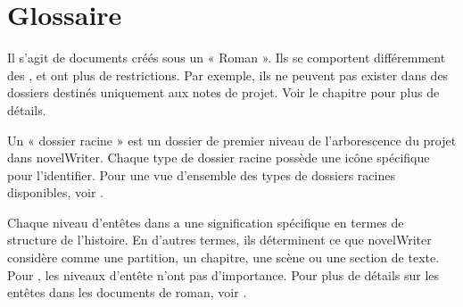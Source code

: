 \documentclass[a4paper,11pt,french]{sphinxmanual}
\begin{document}
\chapter{Glossaire}
\label{\detokenize{int_glossary:glossary}}\label{\detokenize{int_glossary:a-glossary}}\label{\detokenize{int_glossary::doc}}\begin{description}
\sphinxAtStartPar
Il s’agit de documents créés sous un {\hyperref[\detokenize{int_glossary:term-Root-Folder}]{}} « Roman ». Ils se comportent différemment des {\hyperref[\detokenize{int_glossary:term-Project-Notes}]{}}, et ont plus de restrictions. Par exemple, ils ne peuvent pas exister dans des dossiers destinés uniquement aux notes de projet. Voir le chapitre {\hyperref[\detokenize{project_structure:a-struct}]{}} pour plus de détails.

\sphinxAtStartPar
Un « dossier racine » est un dossier de premier niveau de l’arborescence du projet dans novelWriter. Chaque type de dossier racine possède une icône spécifique pour l’identifier. Pour une vue d’ensemble des types de dossiers racines disponibles, voir {\hyperref[\detokenize{project_overview:a-proj-roots}]{}}.

\sphinxAtStartPar
Chaque niveau d’en\sphinxhyphen{}têtes dans {\hyperref[\detokenize{int_glossary:term-Novel-Documents}]{}} a une signification spécifique en termes de structure de l’histoire. En d’autres termes, ils déterminent ce que novelWriter considère comme une partition, un chapitre, une scène ou une section de texte. Pour {\hyperref[\detokenize{int_glossary:term-Project-Notes}]{}}, les niveaux d’en\sphinxhyphen{}tête n’ont pas d’importance. Pour plus de détails sur les en\sphinxhyphen{}têtes dans les documents de roman, voir {\hyperref[\detokenize{project_structure:a-struct-heads}]{}}.


\end{description}
\end{document}
